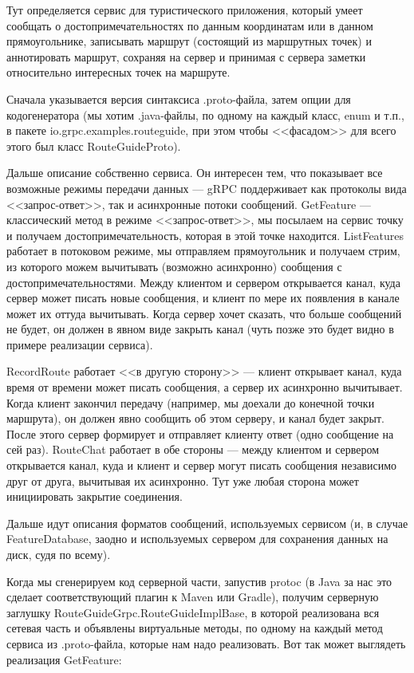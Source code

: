 \documentclass[a5paper]{article}
\begin{document}
Тут определяется сервис для туристического приложения, который умеет сообщать о достопримечательностях по данным координатам или в данном прямоугольнике, записывать маршрут (состоящий из маршрутных точек) и аннотировать маршрут, сохраняя на сервер и принимая с сервера заметки относительно интересных точек на маршруте. 

Сначала указывается версия синтаксиса .proto-файла, затем опции для кодогенератора (мы хотим .java-файлы, по одному на каждый класс, enum и т.п., в пакете io.grpc.examples.routeguide, при этом чтобы <<фасадом>> для всего этого был класс RouteGuideProto).

Дальше описание собственно сервиса. Он интересен тем, что показывает все возможные режимы передачи данных --- gRPC поддерживает как протоколы вида <<запрос-ответ>>, так и асинхронные потоки сообщений. GetFeature --- классический метод в режиме <<запрос-ответ>>, мы посылаем на сервис точку и получаем достопримечательность, которая в этой точке находится. ListFeatures работает в потоковом режиме, мы отправляем прямоугольник и получаем стрим, из которого можем вычитывать (возможно асинхронно) сообщения с достопримечательностями. Между клиентом и сервером открывается канал, куда сервер может писать новые сообщения, и клиент по мере их появления в канале может их оттуда вычитывать. Когда сервер хочет сказать, что больше сообщений не будет, он должен в явном виде закрыть канал (чуть позже это будет видно в примере реализации сервиса).

RecordRoute работает <<в другую сторону>> --- клиент открывает канал, куда время от времени может писать сообщения, а сервер их асинхронно вычитывает. Когда клиент закончил передачу (например, мы доехали до конечной точки маршрута), он должен явно сообщить об этом серверу, и канал будет закрыт. После этого сервер формирует и отправляет клиенту ответ (одно сообщение на сей раз). RouteChat работает в обе стороны --- между клиентом и сервером открывается канал, куда и клиент и сервер могут писать сообщения независимо друг от друга, вычитывая их асинхронно. Тут уже любая сторона может инициировать закрытие соединения.

Дальше идут описания форматов сообщений, используемых сервисом (и, в случае FeatureDatabase, заодно и используемых сервером для сохранения данных на диск, судя по всему).

Когда мы сгенерируем код серверной части, запустив protoc (в Java за нас это сделает соответствующий плагин к Maven или Gradle), получим серверную заглушку RouteGuideGrpc.RouteGuideImplBase, в которой реализована вся сетевая часть и объявлены виртуальные методы, по одному на каждый метод сервиса из .proto-файла, которые нам надо реализовать. Вот так может выглядеть реализация GetFeature:
\end{document}
